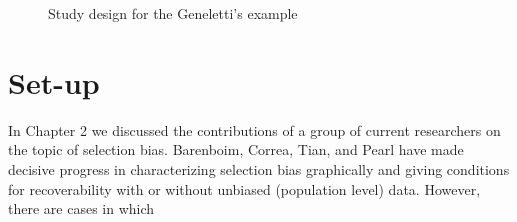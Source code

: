 \documentclass[12pt,twoside]{reedthesis}
\theoremstyle{definition}
\begin{document}
\begin{figure}[H]
\begin{center}
\end{center}
\caption{Study design for the Geneletti's example}
\end{figure}



\section{Set-up}

In Chapter 2 we discussed the contributions of a group of current researchers on the topic of selection bias. Barenboim, Correa, Tian, and Pearl have made decisive progress in characterizing selection bias graphically and giving conditions for recoverability with or without unbiased (population level) data. However, there are cases in which 



  \backmatter %

    \nocite{*}


%  
 
\nocite{*}%
%  
\appendix
\end{document}
